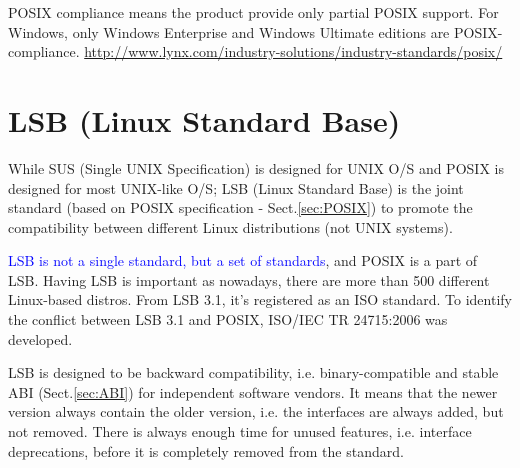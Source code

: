 POSIX compliance means the product provide only partial POSIX support. 
For Windows, only Windows Enterprise and Windows Ultimate editions are
POSIX-compliance.
\url{http://www.lynx.com/industry-solutions/industry-standards/posix/} 

\section{LSB (Linux Standard Base)}
\label{sec:LSB}

While SUS (Single UNIX Specification) is designed for UNIX O/S and POSIX is
designed for most UNIX-like O/S; LSB (Linux Standard Base) is the joint
standard (based on POSIX specification - Sect.\ref{sec:POSIX}) to promote the
compatibility between different Linux distributions (not UNIX systems).

\textcolor{blue}{LSB is not a single standard, but a set of standards}, and
POSIX is a part of LSB. Having LSB is important as nowadays, there are more
than 500 different Linux-based distros. From LSB 3.1, it's registered as an ISO
standard. To identify the conflict between LSB 3.1 and POSIX, ISO/IEC TR
24715:2006 was developed.

LSB is designed to be backward compatibility, i.e. binary-compatible and stable
ABI (Sect.\ref{sec:ABI}) for independent software vendors. It means that the
newer version always contain the older version, i.e. the interfaces are always
added, but not removed. There is always enough time for unused features, i.e.
interface deprecations, before it is completely removed from the standard.

